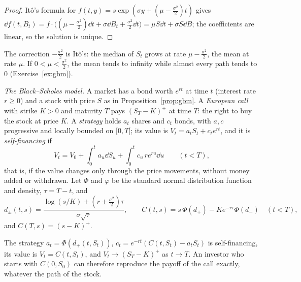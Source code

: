 \begin{proof}
It\^o's formula for $f(t,y)=s\exp(\sigma y+(\mu-\frac{\sigma^2}2)t)$ gives $\dd f(t,B_t)=f\cdot\bigl((\mu-\frac{\sigma^2}2)\dd t+\sigma\dd B_t+\frac{\sigma^2}2\dd t\bigr)=\mu S\dd t+\sigma S\dd B$; the coefficients are linear, so
the solution is unique.
\end{proof}

The correction $-\frac{\sigma^2}2$ is It\^o's: the median of $S_t$ grows at rate $\mu-\frac{\sigma^2}2$, the mean at rate $\mu$. If $0<\mu<\frac{\sigma^2}2$, the mean tends to infinity while almost every path tends
to $0$ (Exercise~\ref{ex:gbm}).

\medskip
\emph{The Black--Scholes model.} A market has a bond worth $e^{rt}$ at time $t$ (interest rate $r\ge0$) and a stock with price $S$ as in Proposition~\ref{prop:gbm}. A \emph{European call} with strike $K>0$ and
maturity $T$ pays $(S_T-K)^+$ at time $T$: the right to buy the stock at price $K$. A \emph{strategy} holds $a_t$ shares and $c_t$ bonds, with $a,c$ progressive and locally bounded on $[0,T[$; its value is
$V_t=a_tS_t+c_te^{rt}$, and it is \emph{self-financing} if
\[
V_t=V_0+\int_0^ta_u\dd S_u+\int_0^tc_u\,re^{ru}\dd u\qquad(t<T),
\]
that is, if the value changes only through the price movements, without money added or withdrawn. Let $\Phi$ and $\varphi$ be the standard normal distribution function and density, $\tau=T-t$, and
\[
d_\pm(t,s)=\frac{\log(s/K)+(r\pm\frac{\sigma^2}2)\tau}{\sigma\sqrt\tau},\qquad C(t,s)=s\,\Phi(d_+)-Ke^{-r\tau}\Phi(d_-)\quad(t<T),
\]
and $C(T,s)=(s-K)^+$.

\begin{theorem}\label{thm:blackscholes}
The strategy $a_t=\Phi(d_+(t,S_t))$, $c_t=e^{-rt}(C(t,S_t)-a_tS_t)$ is self-financing, its value is $V_t=C(t,S_t)$, and $V_t\to(S_T-K)^+$ as $t\to T$. An investor who starts with $C(0,S_0)$ can therefore
reproduce the payoff of the call exactly, whatever the path of the stock.
\end{theorem}

